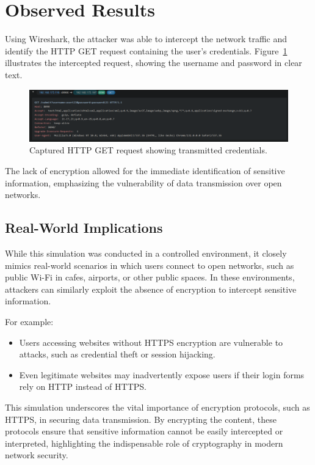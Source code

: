 \section{Observed Results}

Using Wireshark, the attacker was able to intercept the network traffic and identify the HTTP GET request containing the user's credentials. Figure~\ref{fig:wireshark_capture} illustrates the intercepted request, showing the username and password in clear text. 

\begin{figure}[H]
    \centering
    \includegraphics[width=\textwidth]{images/whiresharkcapture.png}
    \caption{Captured HTTP GET request showing transmitted credentials.}
    \label{fig:wireshark_capture}
\end{figure}

The lack of encryption allowed for the immediate identification of sensitive information, emphasizing the vulnerability of data transmission over open networks.

\subsection{Real-World Implications}

While this simulation was conducted in a controlled environment, it closely mimics real-world scenarios in which users connect to open networks, such as public Wi-Fi in cafes, airports, or other public spaces. In these environments, attackers can similarly exploit the absence of encryption to intercept sensitive information.

For example:
\begin{itemize}
    \item Users accessing websites without HTTPS encryption are vulnerable to attacks, such as credential theft or session hijacking.
    \item Even legitimate websites may inadvertently expose users if their login forms rely on HTTP instead of HTTPS.
\end{itemize}

This simulation underscores the vital importance of encryption protocols, such as HTTPS, in securing data transmission. By encrypting the content, these protocols ensure that sensitive information cannot be easily intercepted or interpreted, highlighting the indispensable role of cryptography in modern network security.


